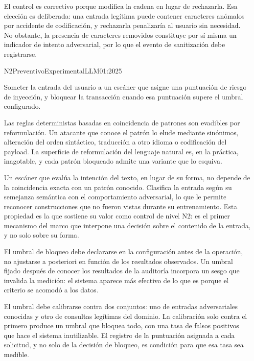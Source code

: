 El control es correctivo porque modifica la cadena en lugar de rechazarla. Esa elección es deliberada: una entrada legítima puede contener caracteres anómalos por accidente de codificación, y rechazarla penalizaría al usuario sin necesidad. No obstante, la presencia de caracteres removidos constituye por sí misma un indicador de intento adversarial, por lo que el evento de sanitización debe registrarse.


  {N2}{Preventivo}{Experimental}{LLM01:2025}

Someter la entrada del usuario a un escáner que asigne una puntuación de riesgo de inyección, y bloquear la transacción cuando esa puntuación supere el umbral configurado.

Las reglas deterministas basadas en coincidencia de patrones son evadibles por reformulación. Un atacante que conoce el patrón lo elude mediante sinónimos, alteración del orden sintáctico, traducción a otro idioma o codificación del payload. La superficie de reformulación del lenguaje natural es, en la práctica, inagotable, y cada patrón bloqueado admite una variante que lo esquiva.

Un escáner que evalúa la intención del texto, en lugar de su forma, no depende de la coincidencia exacta con un patrón conocido. Clasifica la entrada según su semejanza semántica con el comportamiento adversarial, lo que le permite reconocer construcciones que no fueron vistas durante su entrenamiento. Esta propiedad es la que sostiene su valor como control de nivel N2: es el primer mecanismo del marco que interpone una decisión sobre el contenido de la entrada, y no solo sobre su forma.

El umbral de bloqueo debe declararse en la configuración antes de la operación, no ajustarse a posteriori en función de los resultados observados. Un umbral fijado después de conocer los resultados de la auditoría incorpora un sesgo que invalida la medición: el sistema aparece más efectivo de lo que es porque el criterio se acomodó a los datos.

El umbral debe calibrarse contra dos conjuntos: uno de entradas adversariales conocidas y otro de consultas legítimas del dominio. La calibración solo contra el primero produce un umbral que bloquea todo, con una tasa de falsos positivos que hace el sistema inutilizable. El registro de la puntuación asignada a cada solicitud, y no solo de la decisión de bloqueo, es condición para que esa tasa sea medible.

